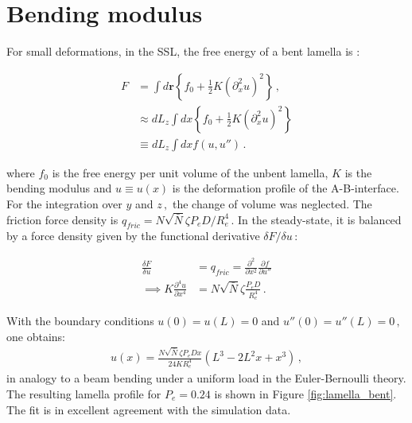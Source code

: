 \documentclass[bachelor,       %
               twoside,        %
               BCOR10mm,       %
               ngerman, english %
               ]{GAUBM}
\begin{document}
\section{Bending modulus}
For small deformations, in the \ac{SSL}, the free energy of a bent lamella is \cite{wang94}:

\begin{align}
    F&=\int d\mathbf r\left\{f_0+\frac{1}{2}K \left(\partial_x^2 u\right)^2\right\}\,,\\
    &\approx dL_z\int dx\left\{f_0+\frac{1}{2}K \left(\partial_x^2 u\right)^2\right\}\nonumber\\
    &\equiv dL_z\int dxf(u,u'')\,.
    \label{eq:F_bend}
\end{align}

where $f_0$ is the free energy per unit volume of the unbent lamella, $K$ is the bending modulus and $u\equiv u(x)$ is the deformation profile of the A-B-interface. For the integration over $y$ and $z\,,$ the change of volume was neglected. The friction force density is $q_{fric}=N\sqrt{\bar N}\zeta P_eD/R_e^4\,.$ In the steady-state, it is balanced by a force density given by the  functional derivative $\delta F/\delta u\,$:

\begin{align}
    \frac{\delta F}{\delta u}&=q_{fric}=\frac{\partial^2}{\partial x^2}\frac{\partial f}{\partial u''} \nonumber \\
    \implies K\frac{\partial^4u}{\partial x^4}&=N\sqrt{\bar N}\zeta\frac{P_eD}{R_e^4} \,.
\end{align}


With the boundary conditions $u(0)=u(L)=0$ and $u''(0)=u''(L)=0\,,$ one obtains:
\begin{align}
    u(x)=\frac{N\sqrt{\bar N}\zeta P_e Dx}{24KR_e^4}(L^3-2L^2x+x^3)\,,
    \label{eq:deflection}
\end{align}
in analogy to a beam bending under a uniform load in the Euler-Bernoulli theory. The resulting lamella profile for $P_e=0.24$ is shown in Figure \ref{fig:lamella_bent}. The fit is in excellent agreement with the simulation data. 
\end{document}
